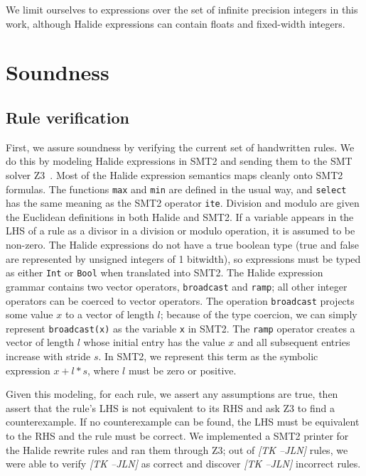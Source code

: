 \documentclass[sigplan,review,anonymous]{acmart}\settopmatter{printfolios=true,printccs=false,printacmref=false}
\newcommand{\jln}[1]{\textcolor{uwpurple}{\textit{[{#1} --JLN]}}}
\begin{document}
We limit ourselves to expressions over the set of infinite precision integers in this work, although Halide expressions can contain floats and fixed-width integers.

\section{Soundness}

\subsection{Rule verification}

First, we assure soundness by verifying the current set of handwritten rules. We do this by modeling Halide expressions in SMT2 and sending them to the SMT solver Z3~\cite{de2008z3}. Most of the Halide expression semantics maps cleanly onto SMT2 formulas. The functions \texttt{max} and \texttt{min} are defined in the usual way, and \texttt{select} has the same meaning as the SMT2 operator \texttt{ite}. Division and modulo are given the Euclidean definitions in both Halide and SMT2. If a variable appears in the LHS of a rule as a divisor in a division or modulo operation, it is assumed to be non-zero. The Halide expressions do not have a true boolean type (true and false are represented by unsigned integers of 1 bitwidth), so expressions must be typed as either \texttt{Int} or \texttt{Bool} when translated into SMT2. The Halide expression grammar contains two vector operators, \texttt{broadcast} and \texttt{ramp}; all other integer operators can be coerced to vector operators. The operation \texttt{broadcast} projects some value $x$ to a vector of length $l$; because of the type coercion, we can simply represent \texttt{broadcast(x)} as the variable \texttt{x} in SMT2. The \texttt{ramp} operator creates a vector of length $l$ whose initial entry has the value $x$ and all subsequent entries increase with stride $s$. In SMT2, we represent this term as the symbolic expression $x + l * s$, where $l$ must be zero or positive.

Given this modeling, for each rule, we assert any assumptions are true, then assert that the rule's LHS is not equivalent to its RHS and ask Z3 to find a counterexample. If no counterexample can be found, the LHS must be equivalent to the RHS and the rule must be correct. We implemented a SMT2 printer for the Halide rewrite rules and ran them through Z3; out of \jln{TK} rules, we were able to verify \jln{TK} as correct and discover \jln{TK} incorrect rules.
\end{document}
